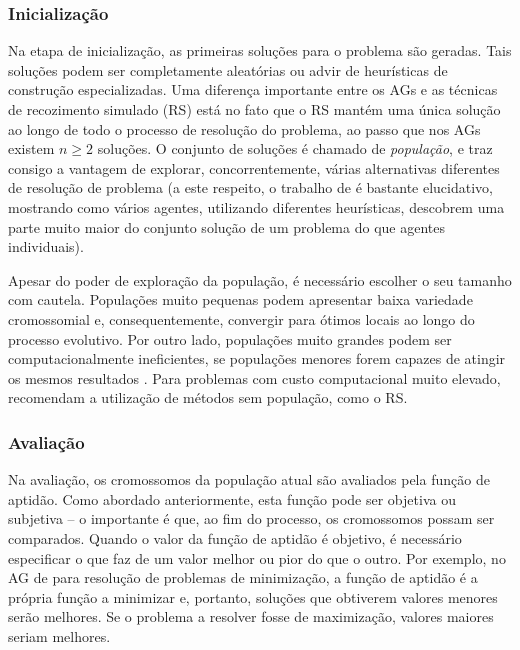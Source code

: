 \subsubsection{Inicialização}

Na etapa de inicialização, as primeiras soluções para o problema são geradas. Tais soluções podem ser completamente aleatórias ou advir de heurísticas de construção especializadas. Uma diferença importante entre os AGs e as técnicas de recozimento simulado (RS) está no fato que o RS mantém uma única solução ao longo de todo o processo de resolução do problema, ao passo que nos AGs existem $n \geq 2$ soluções. O conjunto de soluções é chamado de \emph{população}, e traz consigo a vantagem de explorar, concorrentemente, várias alternativas diferentes de resolução de problema (a este respeito, o trabalho de \textcite{MURAWSKI2016} é bastante elucidativo, mostrando como vários agentes, utilizando diferentes heurísticas, descobrem uma parte muito maior do conjunto solução de um problema do que agentes individuais).

Apesar do poder de exploração da população, é necessário escolher o seu tamanho com cautela. Populações muito pequenas podem apresentar baixa variedade cromossomial e, consequentemente, convergir para ótimos locais ao longo do processo evolutivo. Por outro lado, populações muito grandes podem ser computacionalmente ineficientes, se populações menores forem capazes de atingir os mesmos resultados \cite{ROEVA2013}. Para problemas com custo computacional muito elevado, \textcite{DELAHAYE2019} recomendam a utilização de métodos sem população, como o RS.

\subsubsection{Avaliação}

Na avaliação, os cromossomos da população atual são avaliados pela função de aptidão. Como abordado anteriormente, esta função pode ser objetiva ou subjetiva -- o importante é que, ao fim do processo, os cromossomos possam ser comparados. Quando o valor da função de aptidão é objetivo, é necessário especificar o que faz de um valor melhor ou pior do que o outro. Por exemplo, no AG de \textcite{HERMAWANTO2013} para resolução de problemas de minimização, a função de aptidão é a própria função a minimizar e, portanto, soluções que obtiverem valores menores serão melhores. Se o problema a resolver fosse de maximização, valores maiores seriam melhores.

